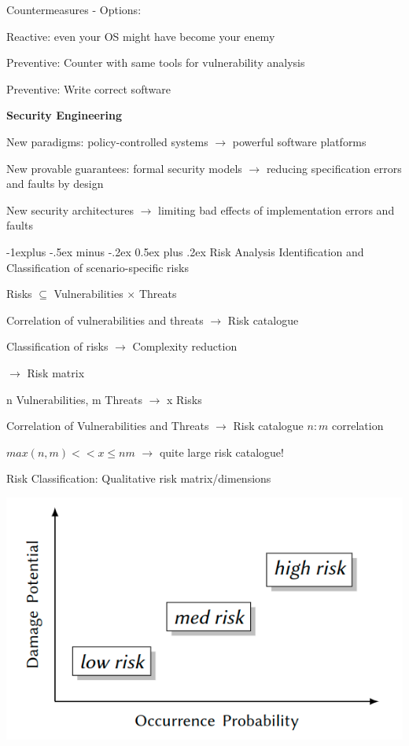 \documentclass[a4paper]{article}
\makeatletter
\renewcommand{\note}[2]{\begin{noteBox} \textbf{#1} #2 \end{noteBox}}
\renewcommand{\subsection}{\@startsection{subsection}{2}{0mm}%
                {-1explus -.5ex minus -.2ex}%
                {0.5ex plus .2ex}%
                {\normalfont\normalsize\bfseries}}
\makeatother
\begin{document}
\begin{multicols}{3}
    Countermeasures - Options:
    \begin{itemize*}
        \item Reactive: even your OS might have become your enemy
        \item Preventive: Counter with same tools for vulnerability analysis
        \item Preventive: Write correct software
    \end{itemize*}

    \note{Security Engineering}{
        \begin{itemize*}
            \item New paradigms: policy-controlled systems $\rightarrow$ powerful software platforms
            \item New provable guarantees: formal security models $\rightarrow$ reducing specification errors and faults by design
            \item New security architectures $\rightarrow$ limiting bad effects of implementation errors and faults
        \end{itemize*}
    }

    \subsection{Risk Analysis}
    Identification and Classification of scenario-specific risks
    \begin{itemize*}
        \item Risks $\subseteq$ Vulnerabilities $\times$ Threats
        \item Correlation of vulnerabilities and threats $\rightarrow$ Risk catalogue
        \item Classification of risks $\rightarrow$ Complexity reduction
        \item[$\rightarrow$] Risk matrix
        \item n Vulnerabilities, m Threats $\rightarrow$ x Risks
        \item Correlation of Vulnerabilities and Threats $\rightarrow$ Risk catalogue $n:m$ correlation
        \item $max(n,m)<< x \leq nm$ $\rightarrow$ quite large risk catalogue!
    \end{itemize*}
    Risk Classification: Qualitative risk matrix/dimensions

    \includegraphics[width=.3\linewidth]{Assets/Systemsicherheit-risk-classification.png}


\end{multicols}
\end{document}
